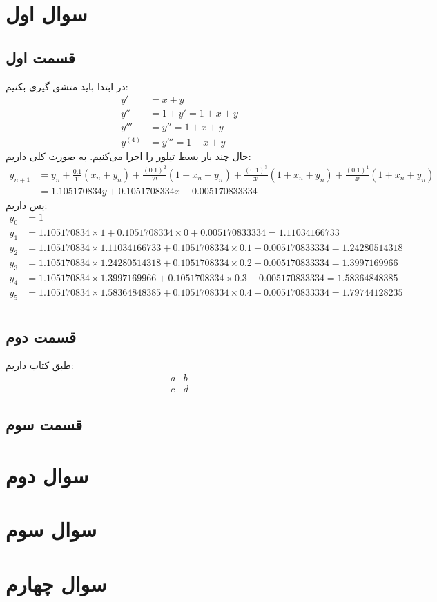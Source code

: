 \documentclass[]{article}
\begin{document}
\printheader

\section*{سوال اول}
\subsection*{قسمت اول}
در ابتدا باید متشق گیری بکنیم:
\begin{align*}
    y' &= x + y\\
    y'' &= 1 + y' = 1 + x + y\\
    y''' &= y'' = 1 + x + y\\
    y^{(4)} &= y''' = 1 + x + y
\end{align*}
حال چند بار بسط تیلور را اجرا می‌کنیم. به صورت کلی داریم:
\begin{align*}
    y_{n+1} &= y_n + \frac{0.1}{1!}(x_n + y_n) + \frac{(0.1)^2}{2!} (1 + x_n + y_n) + \frac{(0.1)^3}{3!} (1 + x_n + y_n) + \frac{(0.1)^4}{4!} (1 + x_n + y_n)\\
    &= 1.105170834 y + 0.1051708334 x + 0.005170833334
\end{align*}
پس داریم:
\begin{align*}
    y_0 &= 1\\
    y_1 &= 1.105170834 \times 1 + 0.1051708334 \times 0 + 0.005170833334 = 1.11034166733\\
    y_2 &= 1.105170834 \times 1.11034166733 + 0.1051708334 \times 0.1 + 0.005170833334 = 1.24280514318\\
    y_3 &= 1.105170834 \times 1.24280514318 + 0.1051708334 \times 0.2 + 0.005170833334 = 1.3997169966\\
    y_4 &= 1.105170834 \times 1.3997169966 + 0.1051708334 \times 0.3 + 0.005170833334 = 1.58364848385\\
    y_5 &= 1.105170834 \times 1.58364848385 + 0.1051708334 \times 0.4 + 0.005170833334 = \boxed{1.79744128235}\\
\end{align*}
\subsection*{قسمت دوم}
طبق کتاب داریم:
\[
\begin{array}{ll}
    a & b\\
    c & d
\end{array}
\]
\subsection*{قسمت سوم}
\section*{سوال دوم}
\section*{سوال سوم}
\section*{سوال چهارم}
\end{document}
